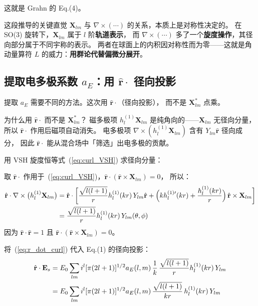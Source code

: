 这就是 Grahn 的 Eq.(4)。

\begin{stepbox}{这段推导的关键直觉}
$\mathbf{X}_{lm}$ 与 $\nabla\times(\cdots)$ 的关系，本质上是对称性决定的。
在 SO(3) 旋转下，$\mathbf{X}_{lm}$ 属于 $l$ 阶\textbf{轨道表示}，
而 $\nabla\times(\cdots)$ 多了一个\textbf{旋度操作}，其径向部分属于不同宇称的表示。
两者在球面上的内积因对称性而为零——这就是角动量算符 $L$ 的威力：\textbf{用群论代替偏微分展开}。
\end{stepbox}

\subsection{提取电多极系数 $a_E$：用 $\hat{\mathbf{r}}\cdot$ 径向投影}

提取 $a_E$ 需要不同的方法。这次用 $\hat{\mathbf{r}}\cdot$（径向投影），
而不是 $\mathbf{X}_{lm}^*$ 点乘。

\begin{stepbox}{为什么用 $\hat{\mathbf{r}}\cdot$ 而不是 $\mathbf{X}_{lm}^*$？}
磁多极项 $h_l^{(1)}\mathbf{X}_{lm}$ 是纯角向的——$\mathbf{X}_{lm}$ 无径向分量，
所以 $\hat{\mathbf{r}}\cdot$ 作用后磁项自动消失。
电多极项 $\nabla\times(h_l^{(1)}\mathbf{X}_{lm})$ 含有 $Y_{lm}\hat{\mathbf{r}}$ 径向成分，
因此 $\hat{\mathbf{r}}\cdot$ 能从混合场中「筛选」出电多极的贡献。
\end{stepbox}

用 VSH 旋度恒等式~(\ref{eq:curl_VSH}) 求径向分量：

取 $\hat{\mathbf{r}}\cdot$ 作用于~(\ref{eq:curl_VSH})，$\hat{\mathbf{r}}\cdot(\hat{\mathbf{r}}\times\mathbf{X}_{lm})=0$，
所以：
\begin{align}
\hat{\mathbf{r}}\cdot\nabla\times\bigl(h_l^{(1)}\mathbf{X}_{lm}\bigr)
&= \hat{\mathbf{r}}\cdot\biggl[
    \frac{\sqrt{l(l+1)}}{r}h_l^{(1)}(kr)\,Y_{lm}\hat{\mathbf{r}}
    + \Bigl(kh_l^{(1)\prime}(kr) + \frac{h_l^{(1)}(kr)}{r}\Bigr)\,\hat{\mathbf{r}}\times\mathbf{X}_{lm}
    \biggr] \notag\\
&= \frac{\sqrt{l(l+1)}}{r}h_l^{(1)}(kr)\,Y_{lm}(\theta,\phi)
\label{eq:r_dot_curl}
\end{align}
因为 $\hat{\mathbf{r}}\cdot\hat{\mathbf{r}}=1$ 且 $\hat{\mathbf{r}}\cdot(\hat{\mathbf{r}}\times\mathbf{X}_{lm})=0$。

将~(\ref{eq:r_dot_curl}) 代入 Eq.(1) 的径向投影：
\begin{align}
\hat{\mathbf{r}}\cdot\mathbf{E}_s
&= E_0\sum_{lm} i^l[\pi(2l+1)]^{1/2}
   a_E(l,m)\,\frac{1}{k}\,
   \frac{\sqrt{l(l+1)}}{r}h_l^{(1)}(kr)\,Y_{lm} \notag\\
&= E_0\sum_{lm} i^l[\pi(2l+1)]^{1/2}
   a_E(l,m)\,\frac{\sqrt{l(l+1)}}{kr}\,h_l^{(1)}(kr)\,Y_{lm}
\end{align}

